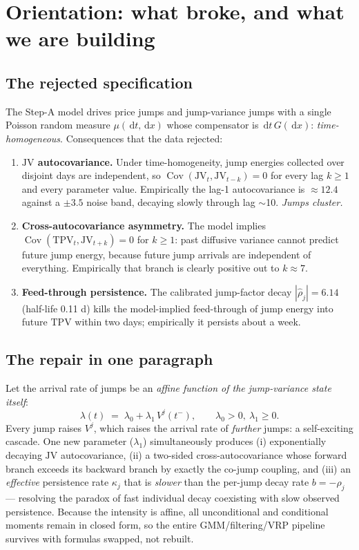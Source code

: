\documentclass[11pt]{report}
\theoremstyle{definition}
\theoremstyle{remark}
\newcommand{\Cov}{\operatorname{Cov}}
\newcommand{\dd}{\,\mathrm{d}}
\newcommand{\Vj}{V^{j}}
\newcommand{\TPV}{\mathrm{TPV}}
\newcommand{\JV}{\mathrm{JV}}
\begin{document}
\tableofcontents

\chapter{Orientation: what broke, and what we are building}
\label{ch:orientation}

\section{The rejected specification}

The Step-A model drives price jumps and jump-variance jumps with a single
Poisson random measure $\mu(\dd t,\dd x)$ whose compensator is
$\dd t\,G(\dd x)$: \emph{time-homogeneous}. Consequences that the data
rejected:

\begin{enumerate}
\item \textbf{$\JV$ autocovariance.} Under time-homogeneity, jump energies
collected over disjoint days are independent, so
$\Cov(\JV_t,\JV_{t-k})=0$ for every lag $k\ge 1$ and every parameter value.
Empirically the lag-1 autocovariance is $\approx 12.4$ against a
$\pm 3.5$ noise band, decaying slowly through lag $\sim$10. \emph{Jumps
cluster.}
\item \textbf{Cross-autocovariance asymmetry.} The model implies
$\Cov(\TPV_t,\JV_{t+k})=0$ for $k\ge 1$: past diffusive variance cannot
predict future jump energy, because future jump arrivals are independent of
everything. Empirically that branch is clearly positive out to $k\approx 7$.
\item \textbf{Feed-through persistence.} The calibrated jump-factor decay
$|\hat\rho_j|=6.14$ (half-life 0.11 d) kills the model-implied feed-through of
jump energy into future $\TPV$ within two days; empirically it persists about
a week.
\end{enumerate}

\section{The repair in one paragraph}

Let the arrival rate of jumps be an \emph{affine function of the jump-variance
state itself}:
\[
\lambda(t) \;=\; \lambda_{0} + \lambda_{1}\,\Vj(t^{-}), \qquad
\lambda_{0}>0,\ \lambda_{1}\ge 0 .
\]
Every jump raises $\Vj$, which raises the arrival rate of \emph{further}
jumps: a self-exciting cascade. One new parameter ($\lambda_{1}$)
simultaneously produces (i) exponentially decaying $\JV$ autocovariance,
(ii) a two-sided cross-autocovariance whose forward branch exceeds its
backward branch by exactly the co-jump coupling, and (iii) an
\emph{effective} persistence rate $\kappa_{j}$ that is \emph{slower} than the
per-jump decay rate $b=-\rho_j$ --- resolving the paradox of
fast individual decay coexisting with slow observed persistence. Because the
intensity is affine, all unconditional and conditional moments remain in
closed form, so the entire GMM/filtering/VRP pipeline survives with formulas
swapped, not rebuilt.
\end{document}
